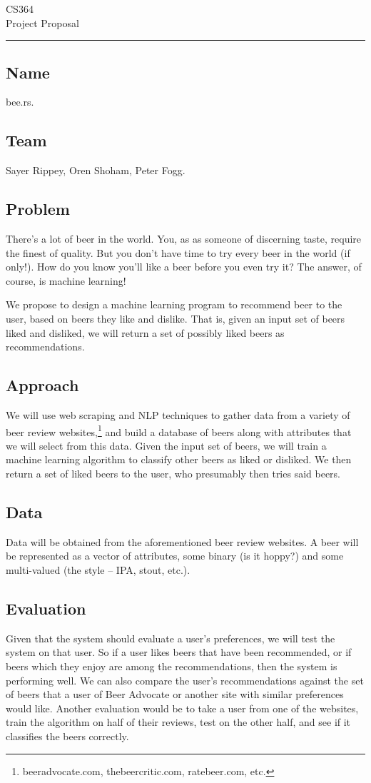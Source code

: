 \documentclass[11pt]{article}
\renewcommand{\maketitle}{
  \begin{center}
    \begin{flushright}
      CS364 \\
      Project Proposal
    \end{flushright}
    \rule{\linewidth}{0.1mm}
  \end{center}
}
\begin{document}
\maketitle
\subsection*{Name}
bee.rs.
\subsection*{Team}
Sayer Rippey, Oren Shoham, Peter Fogg.
\subsection*{Problem}
There's a lot of beer in the world. You, as as someone of discerning taste, require the finest of quality. But you don't have time to try every beer in the world (if only!). How do you know you'll like a beer before you even try it? The answer, of course, is machine learning!

We propose to design a machine learning program to recommend beer to the user, based on beers they like and dislike. That is, given an input set of beers liked and disliked, we will return a set of possibly liked beers as recommendations.
\subsection*{Approach}
We will use web scraping and NLP techniques to gather data from a variety of beer review websites,\footnote{beeradvocate.com, thebeercritic.com, ratebeer.com, etc.} and build a database of beers along with attributes that we will select from this data. Given the input set of beers, we will train a machine learning algorithm to classify other beers as liked or disliked. We then return a set of liked beers to the user, who presumably then tries said beers.
\subsection*{Data}
Data will be obtained from the aforementioned beer review websites. A beer will be represented as a vector of attributes, some binary (is it hoppy?) and some multi-valued (the style -- IPA, stout, etc.).
\subsection*{Evaluation}
Given that the system should evaluate a user's preferences, we will test the system on that user. So if a user likes beers that have been recommended, or if beers which they enjoy are among the recommendations, then the system is performing well. We can also compare the user's recommendations against the set of beers that a user of Beer Advocate or another site with similar preferences would like. Another evaluation would be to take a user from one of the websites, train the algorithm on half of their reviews, test on the other half, and see if it classifies the beers correctly.
\end{document}

